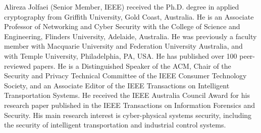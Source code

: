 \documentclass[lettersize,journal]{IEEEtran}
\begin{document}
\vspace{-20pt}
\begin{IEEEbiographynophoto}{Alireza Jolfaei}
(Senior Member, IEEE) received the Ph.D. degree in applied cryptography from Griffith University, Gold Coast, Australia. He is an Associate Professor of Networking and Cyber Security with the College of Science and Engineering, Flinders University, Adelaide, Australia. He was previously a faculty member with Macquarie University and Federation University Australia, and with Temple University, Philadelphia, PA, USA. He has published over 100 peer-reviewed papers. He is a Distinguished Speaker of the ACM, Chair of the Security and Privacy Technical Committee of the IEEE Consumer Technology Society, and an Associate Editor of the IEEE Transactions on Intelligent Transportation Systems. He received the IEEE Australia Council Award for his research paper published in the IEEE Transactions on Information Forensics and Security. His main research interest is cyber-physical systems security, including the security of intelligent transportation and industrial control systems.
\end{IEEEbiographynophoto}
\end{document}
